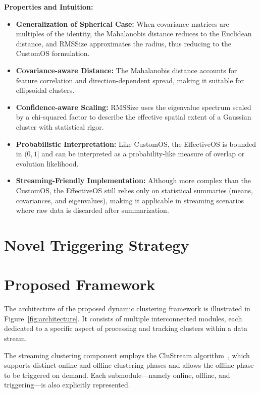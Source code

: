 \textbf{Properties and Intuition:}
\begin{itemize}
      \item \textbf{Generalization of Spherical Case:} When covariance matrices are multiples
            of the identity, the Mahalanobis distance reduces to the Euclidean distance, and
            RMSSize approximates the radius, thus reducing to the CustomOS formulation.
      \item \textbf{Covariance-aware Distance:} The Mahalanobis distance accounts for
            feature correlation and direction-dependent spread, making it suitable for ellipsoidal clusters.
      \item \textbf{Confidence-aware Scaling:} RMSSize uses the eigenvalue spectrum scaled
            by a chi-squared factor to describe the effective spatial extent of a Gaussian cluster
            with statistical rigor.
      \item \textbf{Probabilistic Interpretation:} Like CustomOS, the EffectiveOS is bounded
            in $ (0, 1] $ and can be interpreted as a probability-like measure of overlap or evolution
            likelihood.
      \item \textbf{Streaming-Friendly Implementation:} Although more complex than the CustomOS,
            the EffectiveOS still relies only on statistical summaries (means, covariances, and eigenvalues),
            making it applicable in streaming scenarios where raw data is discarded after summarization.
\end{itemize}

\section{Novel Triggering Strategy}\label{sec:novel_triggering_strategy}

\section{Proposed Framework}\label{sec:proposed_framework}

The architecture of the proposed dynamic clustering framework is illustrated in
Figure~\ref{fig:architecture}. It consists of multiple interconnected modules,
each dedicated to a specific aspect of processing and tracking clusters within
a data stream.

The streaming clustering component employs the CluStream
algorithm~\cite{clustream}, which supports distinct online and offline
clustering phases and allows the offline phase to be triggered on demand. Each
submodule—namely online, offline, and triggering—is also explicitly
represented.

